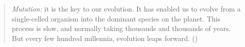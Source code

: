 \null
\vfill
\begin{quote}
\emph{Mutation:} it is the key to our evolution. It has enabled us to evolve
from a single-celled organism into the dominant species on the planet. This
process is slow, and normally taking thousands and thousands of years. But
every few hundred millennia, evolution leaps forward. (\cite{singer2000})
\end{quote}

